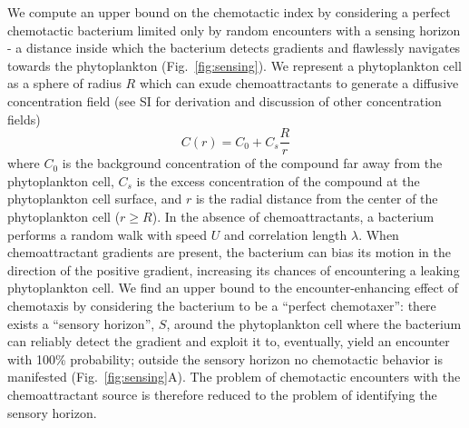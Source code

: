 \documentclass[9pt,twocolumn,twoside]{pnas-new}
\begin{document}
We compute an upper bound on the chemotactic index by considering a perfect chemotactic bacterium limited only by random encounters with a sensing horizon - a distance inside which the bacterium detects gradients and flawlessly navigates towards the phytoplankton (Fig.~\ref{fig:sensing}).
We represent a phytoplankton cell as a sphere of radius $R$ which can exude chemoattractants to generate a diffusive concentration field (see SI for derivation and discussion of other concentration fields)
\begin{equation}\label{chemoattractant_field}
    C(r) = C_0 + C_s \dfrac{R}{r}
\end{equation}
where $C_0$ is the background concentration of the compound far away from the phytoplankton cell, $C_s$ is the excess concentration of the compound at the phytoplankton cell surface, and $r$ is the radial distance from the center of the phytoplankton cell ($r\geq R$).
In the absence of chemoattractants, a bacterium performs a random walk with speed $U$ and correlation length $\lambda$. When chemoattractant gradients are present, the bacterium can bias its motion in the direction of the positive gradient, increasing its chances of encountering a leaking phytoplankton cell. We find an upper bound to the encounter-enhancing effect of chemotaxis by considering the bacterium to be a ``perfect chemotaxer'': there exists a ``sensory horizon'', $S$, around the phytoplankton cell where the bacterium can reliably detect the gradient and exploit it to, eventually, yield an encounter with 100\% probability; outside the sensory horizon no chemotactic behavior is manifested (Fig.~\ref{fig:sensing}A).
The problem of chemotactic encounters with the chemoattractant source is therefore reduced to the problem of identifying the sensory horizon.
\end{document}
